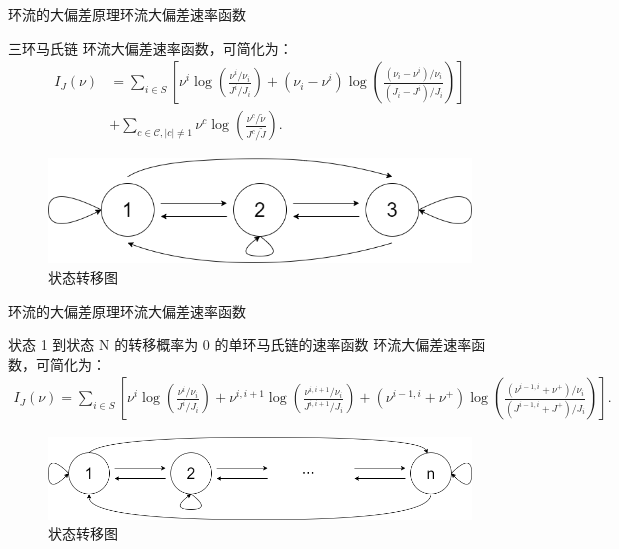 \documentclass{beamer}
\begin{document}
\begin{frame}{环流的大偏差原理}{环流大偏差速率函数}
	\begin{block}{三环马氏链}
		环流大偏差速率函数，可简化为：
		\begin{align*}
			I_J(\nu) & =
			\sum_{i\in S} \left[\nu^{i}\log \left(\frac{\nu^{i}/\nu_i}{J^i/J_i}\right) + (\nu_i - \nu^i)\log \left(\frac{(\nu_i - \nu^i)/\nu_i}{(J_i - J^i)/J_i} \right)
			\right]                                                                                                               \\
			         & + \sum_{c \in \mathcal{C}, |c|\neq 1} \nu^{c} \log \left(\frac{\nu^{c}/\tilde{\nu}}{J^c/\tilde{J}}\right).
		\end{align*}
		\begin{figure}[h]
			\centering
			\includegraphics[scale=0.3]{chart/3-state.png}
			\caption*{状态转移图}
		\end{figure}
	\end{block}
\end{frame}

\begin{frame}{环流的大偏差原理}{环流大偏差速率函数}
	\begin{block}{状态 1 到状态 N 的转移概率为 0 的单环马氏链的速率函数}
		环流大偏差速率函数，可简化为：
		{\scriptsize
		\begin{align*}
			I_J(\nu) = \sum_{i\in S}\left[\nu^i\log\left(\frac{\nu^i/\nu_i}{J^i/J_i}\right)
				+\nu^{i,i+1}\log\left(\frac{\nu^{i,i+1}/\nu_i}{J^{i,i+1}/J_i}\right)+\left(\nu^{i-1,i}+\nu^+\right)\log\left(\frac{\left(\nu^{i-1,i}+\nu^+\right)/\nu_i}
				{\left(J^{i-1,i}+J^+\right)/J_i}\right)\right].
		\end{align*}}
		\begin{figure}[h]
			\centering
			\includegraphics[scale=0.3]{chart/n-state2.png}
			\caption*{状态转移图}
		\end{figure}
	\end{block}
\end{frame}
\end{document}
